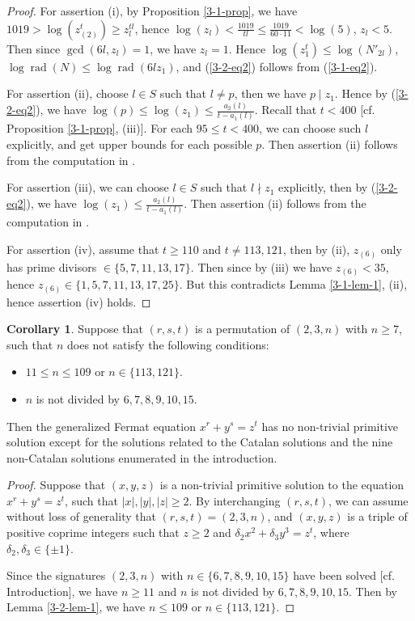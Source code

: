 \documentclass[a4paper, 12pt]{article}
\DeclareMathOperator{\rad}{\text{rad}}
\numberwithin{equation}{section}
\theoremstyle{definition}
\newtheorem{cor}[thm]{Corollary}
\begin{document}
\begin{proof}
For assertion (i), by Proposition \ref{3-1-prop}, we have $1019 > \log(z_{(2)}^t) \ge z_l^{tl}$, hence $\log(z_l) < \frac{1019}{t l } \le \frac{1019}{60 \cdot 11} < \log(5)$, $z_l < 5$. Then since $\gcd(6l, z_l) = 1$, we have $z_l = 1$. 
Hence $\log(z_1^t) \le \log(N'_{2l})$, $\log\rad(N) \le \log\rad(6l z_1)$, and  (\ref{3-2-eq2}) follows from (\ref{3-1-eq2}).

For assertion (ii), choose $l\in S$ such that $l\neq p$, then we have $p\mid z_1$. 
Hence by (\ref{3-2-eq2}), we have $\log(p) \le \log(z_1) \le \frac{a_2(l)}{t - a_1(l)}$.
Recall that $t < 400$ [cf. Proposition \ref{3-1-prop}, (iii)]. 
For each $95 \le t < 400$, we can choose such $l$ explicitly, and get upper bounds for each possible $p$. Then assertion (ii) follows from the computation in \cite{code_of_zpzhou}.

For assertion (iii), we can choose $l\in S$ such that $l\nmid z_1$ explicitly, then by (\ref{3-2-eq2}), we have $\log(z_1) \le \frac{a_2(l)}{t - a_1(l)}$. Then assertion (ii) follows from the computation in \cite{code_of_zpzhou}.

For assertion (iv), assume that $t \ge 110$ and $t\neq 113, 121$, then by (ii),  $z_{(6)}$ only has prime divisors $\in \{5,7,11,13,17\}$. Then since by (iii) we have $z_{(6)} < 35$, hence $z_{(6)} \in \{1, 5, 7, 11, 13, 17, 25\}$. But this contradicts Lemma \ref{3-1-lem-1}, (ii), hence assertion (iv) holds.
\end{proof}

\begin{cor} \label{3-2-cor}
Suppose that $(r,s,t)$ is a permutation of $(2,3,n)$ with $n\ge 7$, such that $n$ does not satisfy the following conditions:
\begin{itemize}
\item $11\le n \le 109$ or $n\in \{113, 121\}$.
\item $n$ is not divided by $6,7,8,9,10,15$.
\end{itemize}
Then the generalized Fermat equation $x^r + y^s = z^t$ has no non-trivial primitive solution except for the solutions related to the  Catalan solutions and the nine non-Catalan solutions enumerated in the introduction.
\end{cor}
\begin{proof}
Suppose that $(x,y,z)$ is a non-trivial primitive solution to the equation $x^r + y^s = z^t$, such that $|x|, |y|, |z| \ge 2$.
By interchanging $(r,s,t)$, we can assume without loss of generality that $(r,s,t) = (2,3,n)$, and $(x,y,z)$ is a triple of positive coprime integers such that $z\ge 2$ and $\delta_2 x^2 + \delta_3 y^3 = z^t$, where $\delta_2,\delta_3 \in \{\pm 1\}$. 

Since the signatures $(2,3,n)$ with $n\in\{6,7,8,9,10,15\}$ have been solved [cf. Introduction], we have $n\ge 11$ and $n$ is not divided by $6,7,8,9,10,15$.
Then by Lemma \ref{3-2-lem-1}, we have $n \le 109$ or $n\in \{113, 121\}$.
\end{proof}
\end{document}
